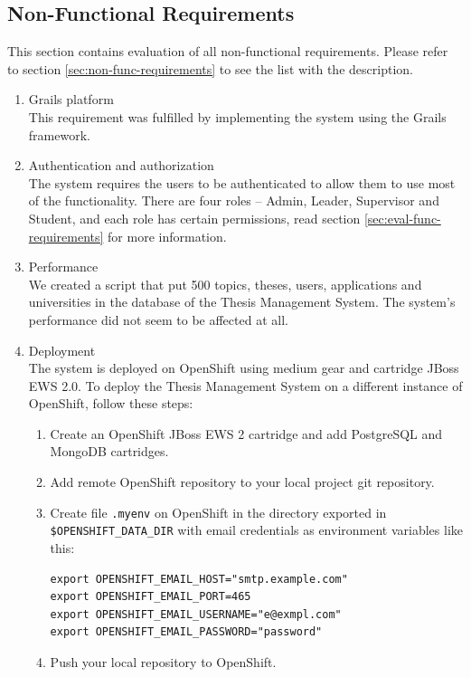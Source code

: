 \subsection{Non-Functional Requirements}

This section contains evaluation of all non-functional requirements. Please refer to section \ref{sec:non-func-requirements} to see the list with the description.

\begin{enumerate}
    \item Grails platform\\
    This requirement was fulfilled by implementing the system using the Grails framework.

    \item Authentication and authorization\\
    The system requires the users to be authenticated to allow them to use most of the functionality. There are four roles -- Admin, Leader, Supervisor and Student, and each role has certain permissions, read section \ref{sec:eval-func-requirements} for more information.

    \item Performance\\
    We created a script that put 500 topics, theses, users, applications and universities in the database of the Thesis Management System. The system's performance did not seem to be affected at all.

    \item Deployment\\
    The system is deployed on OpenShift using medium gear and cartridge JBoss EWS 2.0. To deploy the Thesis Management System on a different instance of OpenShift, follow these steps:
    \begin{enumerate}
        \item Create an OpenShift JBoss EWS 2 cartridge and add PostgreSQL and MongoDB cartridges.
        \item Add remote OpenShift repository to your local project git repository.
        \item Create file \texttt{.myenv} on OpenShift in the directory exported in \texttt{\$OPENSHIFT\_DATA\_DIR} with email credentials as environment variables like this:
            \begin{verbatim}
export OPENSHIFT_EMAIL_HOST="smtp.example.com"
export OPENSHIFT_EMAIL_PORT=465
export OPENSHIFT_EMAIL_USERNAME="e@exmpl.com"
export OPENSHIFT_EMAIL_PASSWORD="password"
            \end{verbatim}
        \item Push your local repository to OpenShift.


\end{enumerate}
\end{enumerate}
